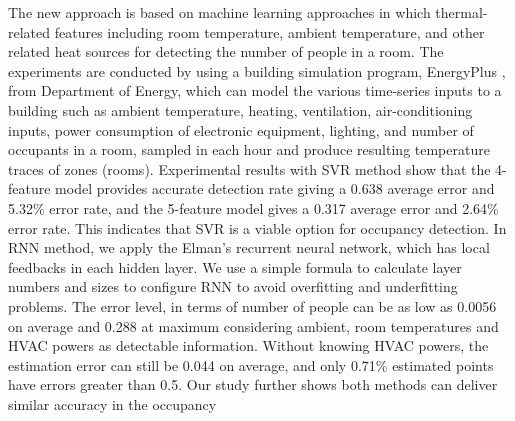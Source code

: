 \textcolor{feb18rev}{The new approach is based on machine learning
  approaches in which thermal-related features including room
  temperature, ambient temperature, and other related heat sources for
  detecting the number of people in a room.  The experiments are
  conducted by using a building simulation program,
  EnergyPlus \cite{energyplus:2001vf}, from Department of Energy,
  which can model the various time-series inputs to a building such as
  ambient temperature, heating, ventilation, air-conditioning
  inputs, power consumption of electronic equipment, lighting, and
  number of occupants in a room, sampled in each hour and produce
  resulting temperature traces of zones (rooms).}  Experimental
results with SVR method show that the 4-feature model provides accurate
detection rate giving a 0.638 average error and 5.32\% error rate, and
the 5-feature model gives a 0.317 average error and 2.64\% error
rate. This indicates that SVR is a viable option for occupancy
detection.  In RNN method, we apply the Elman's recurrent neural
network, which has local feedbacks in each hidden layer. We use a simple
formula to calculate layer numbers and sizes to configure RNN
to avoid overfitting and underfitting problems. The error
level, in terms of number of people can be as low as 0.0056 on average
and 0.288 at maximum considering ambient, room temperatures and HVAC
powers as detectable information. Without knowing HVAC powers, the
estimation error can still be 0.044 on average, and only 0.71\%
estimated points have errors greater than 0.5. Our study further shows
both methods can deliver similar accuracy in the occupancy
